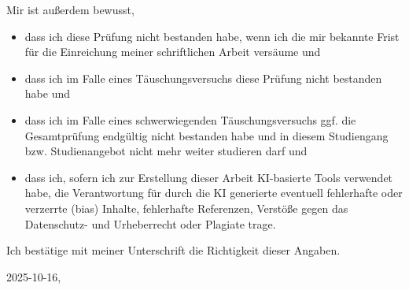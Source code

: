 \documentclass[
  12pt,
  oneside]{book}
\providecommand{\tightlist}{%
  \setlength{\itemsep}{0pt}\setlength{\parskip}{0pt}}
\begin{document}
Mir ist außerdem bewusst,

\begin{itemize}
\tightlist
\item
  dass ich diese Prüfung nicht bestanden habe, wenn ich die mir bekannte Frist für die Einreichung meiner schriftlichen Arbeit versäume und
\item
  dass ich im Falle eines Täuschungsversuchs diese Prüfung nicht bestanden habe und
\item
  dass ich im Falle eines schwerwiegenden Täuschungsversuchs ggf. die Gesamtprüfung endgültig nicht bestanden habe und in diesem Studiengang bzw. Studienangebot nicht mehr weiter studieren darf und
\item
  dass ich, sofern ich zur Erstellung dieser Arbeit KI-basierte Tools verwendet habe, die Verantwortung für durch die KI generierte eventuell fehlerhafte oder verzerrte (bias) Inhalte, fehlerhafte Referenzen, Verstöße gegen das Datenschutz- und Urheberrecht oder Plagiate trage.
\end{itemize}

Ich bestätige mit meiner Unterschrift die Richtigkeit dieser Angaben.

2025-10-16,
\end{document}

